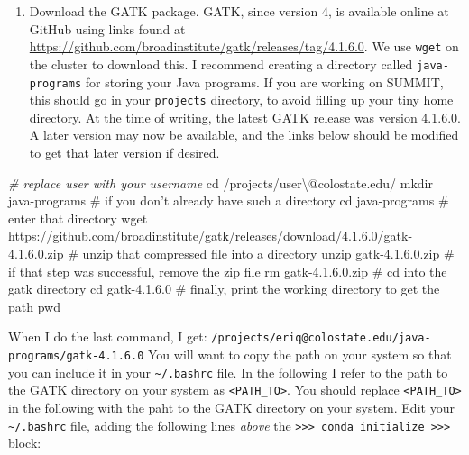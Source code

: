 \documentclass[]{krantz}
\makeatletter
\newenvironment{Shaded}{\begin{snugshade}}{\end{snugshade}}
\newcommand{\BuiltInTok}[1]{#1}
\newcommand{\CommentTok}[1]{\textcolor[rgb]{0.37,0.37,0.37}{\textit{#1}}}
\newcommand{\FunctionTok}[1]{\textcolor[rgb]{0,0,0}{#1}}
\newcommand{\NormalTok}[1]{#1}
\newcommand{\StringTok}[1]{\textcolor[rgb]{0.5,0.5,0.5}{#1}}
\providecommand{\tightlist}{%
  \setlength{\itemsep}{0pt}\setlength{\parskip}{0pt}}
\newenvironment{kframe}{%
\medskip{}
\setlength{\fboxsep}{.8em}
 \def\at@end@of@kframe{}%
 \ifinner\ifhmode%
  \def\at@end@of@kframe{\end{minipage}}%
  \begin{minipage}{\columnwidth}%
 \fi\fi%
 \def\FrameCommand##1{\hskip\@totalleftmargin \hskip-\fboxsep
 \colorbox{shadecolor}{##1}\hskip-\fboxsep
     \hskip-\linewidth \hskip-\@totalleftmargin \hskip\columnwidth}%
 \MakeFramed {\advance\hsize-\width
   \@totalleftmargin\z@ \linewidth\hsize
   \@setminipage}}%
 {\par\unskip\endMakeFramed%
 \at@end@of@kframe}
\renewenvironment{Shaded}{\begin{kframe}}{\end{kframe}}
\makeatother
\begin{document}
\begin{enumerate}
\def\labelenumi{\arabic{enumi}.}
\tightlist
\item
  Download the GATK package. GATK, since version 4, is available online
  at GitHub using links found at \url{https://github.com/broadinstitute/gatk/releases/tag/4.1.6.0}. We use \texttt{wget} on the cluster to download this. I recommend creating a directory called \texttt{java-programs} for
  storing your Java programs. If you are working on SUMMIT, this should go in your \texttt{projects} directory, to avoid
  filling up your tiny home directory. At the time of writing, the latest GATK release was version 4.1.6.0.
  A later version may now be available, and the links below should be modified to get that later
  version if desired.
\end{enumerate}

\begin{Shaded}
\begin{Highlighting}[]
\CommentTok{# replace user with your username}
\BuiltInTok{cd}\NormalTok{ /projects/user\textbackslash{}@colostate.edu/}
\FunctionTok{mkdir}\NormalTok{ java-programs  # if you don}\StringTok{'t already have such a directory}
\StringTok{cd java-programs # enter that directory}
\StringTok{wget https://github.com/broadinstitute/gatk/releases/download/4.1.6.0/gatk-4.1.6.0.zip}
\StringTok{# unzip that compressed file into a directory}
\StringTok{unzip gatk-4.1.6.0.zip}
\StringTok{# if that step was successful, remove the zip file}
\StringTok{rm gatk-4.1.6.0.zip}
\StringTok{# cd into the gatk directory}
\StringTok{cd gatk-4.1.6.0}
\StringTok{# finally, print the working directory to get the path}
\StringTok{pwd}
\end{Highlighting}
\end{Shaded}

When I do the last command, I get: \texttt{/projects/eriq@colostate.edu/java-programs/gatk-4.1.6.0} You will
want to copy the path on your system so that you can include it in your \texttt{\textasciitilde{}/.bashrc} file. In the following
I refer to the path to the GATK directory on your system as \texttt{\textless{}PATH\_TO\textgreater{}}. You should replace \texttt{\textless{}PATH\_TO\textgreater{}}
in the following with the paht to the GATK directory on your system. Edit your \texttt{\textasciitilde{}/.bashrc} file,
adding the following lines \emph{above} the \texttt{\textgreater{}\textgreater{}\textgreater{}\ conda\ initialize\ \textgreater{}\textgreater{}\textgreater{}} block:
\end{document}
